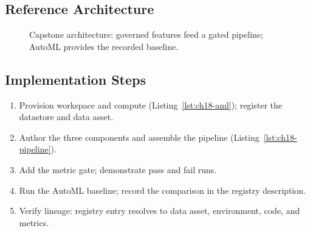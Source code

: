 \subsection*{Reference Architecture}
\begin{figure}[H]
    \centering
    \caption{Capstone architecture: governed features feed a gated pipeline; AutoML provides the recorded baseline.}
    \label{fig:ch18-capstone-arch}
\end{figure}

\subsection*{Implementation Steps}
\begin{enumerate}
    \item Provision workspace and compute (Listing~\ref{lst:ch18-aml}); register the datastore and data asset.
    \item Author the three components and assemble the pipeline (Listing~\ref{lst:ch18-pipeline}).
    \item Add the metric gate; demonstrate pass and fail runs.
    \item Run the AutoML baseline; record the comparison in the registry description.
    \item Verify lineage: registry entry resolves to data asset, environment, code, and metrics.
\end{enumerate}

